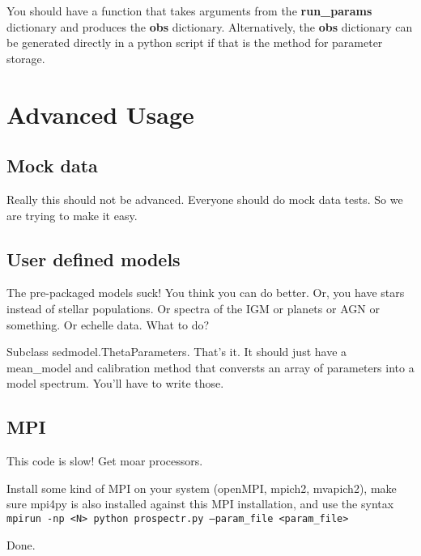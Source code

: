 
You should have a function that takes arguments from the {\bf
run_params} dictionary and produces the {\bf obs} dictionary.
Alternatively, the {\bf obs} dictionary can be generated directly in a
python script if that is the method for parameter storage.

\section{Advanced Usage}

\subsection{Mock data}
Really this should not be advanced.  Everyone should do mock data
tests.  So we are trying to make it easy.

\subsection{User defined models}
The pre-packaged models suck!  You think you can do better.  Or, you
have stars instead of stellar populations.  Or spectra of the IGM or
planets or AGN or something. Or echelle data. What to do?

Subclass sedmodel.ThetaParameters.  That's it.  It should just have a
mean_model and calibration method that conversts an array of
parameters into a model spectrum.  You'll have to write those.

\subsection{MPI}
This code is slow!  Get moar processors.

Install some kind of MPI on your system (openMPI, mpich2, mvapich2), make sure mpi4py is also
installed against this MPI installation, and use the syntax
\texttt{mpirun -np <N> python prospectr.py --param_file <param_file>}

Done.



